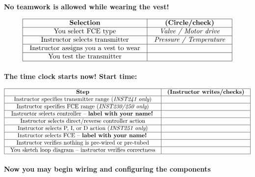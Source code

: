 \vskip 20pt

\centerline{\bf No teamwork is allowed while wearing the vest!}

\vskip 10pt


$$\vbox{\offinterlineskip
\halign{\strut
\vrule \quad\hfil # \ \hfil & 
\vrule \quad\hfil # \ \hfil \vrule \cr
\noalign{\hrule}
%
{\bf Selection} & {\bf (Circle/check)} \cr
%
\noalign{\hrule}
%
You select FCE type & {\it Valve / Motor drive} \cr
%
\noalign{\hrule}
%
Instructor selects transmitter & {\it Pressure / Temperature} \cr
%
\noalign{\hrule}
%
Instructor assigns you a vest to wear &  \cr
%
\noalign{\hrule}
%
You test the transmitter &  \cr
%
\noalign{\hrule}
} %
}$$ %

\vskip 10pt

\centerline{\bf The time clock starts now! \hskip 50pt Start time: \underbar{\hskip 80pt}}


$$\vbox{\offinterlineskip
\halign{\strut
\vrule \quad\hfil # \ \hfil & 
\vrule \quad\hfil # \ \hfil \vrule \cr
\noalign{\hrule}
%
{\bf Step} & {\bf (Instructor writes/checks)} \cr
%
\noalign{\hrule}
%
Instructor specifies transmitter range ({\it INST241 only}) &  \cr
%
\noalign{\hrule}
%
Instructor specifies FCE range ({\it INST230/250 only}) &  \cr
%
\noalign{\hrule}
%
Instructor selects controller -- {\bf label with your name!} &  \cr
%
\noalign{\hrule}
%
Instructor selects direct/reverse controller action & \cr
%
\noalign{\hrule}
%
Instructor selects P, I, or D action ({\it INST251 only}) &  \cr
%
\noalign{\hrule}
%
Instructor selects FCE -- {\bf label with your name!} &  \cr
%
\noalign{\hrule}
%
Instructor verifies nothing is pre-wired or pre-tubed &  \cr
%
\noalign{\hrule}
%
You sketch loop diagram -- instructor verifies correctness &  \cr
%
\noalign{\hrule}
} %
}$$ %

\vskip 10pt

\centerline{\bf Now you may begin wiring and configuring the components}



